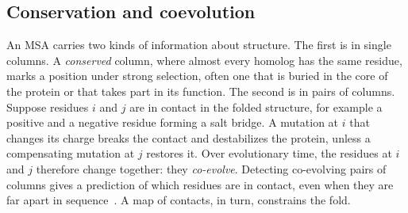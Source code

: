 \subsection{Conservation and coevolution}

An MSA carries two kinds of information about structure. The first is in single columns. A \emph{conserved} column, where almost every homolog has the same residue, marks a position under strong selection, often one that is buried in the core of the protein or that takes part in its function. The second is in pairs of columns. Suppose residues $i$ and $j$ are in contact in the folded structure, for example a positive and a negative residue forming a salt bridge. A mutation at $i$ that changes its charge breaks the contact and destabilizes the protein, unless a compensating mutation at $j$ restores it. Over evolutionary time, the residues at $i$ and $j$ therefore change together: they \emph{co-evolve}. Detecting co-evolving pairs of columns gives a prediction of which residues are in contact, even when they are far apart in sequence~\citep{gobel1994}. A map of contacts, in turn, constrains the fold.

